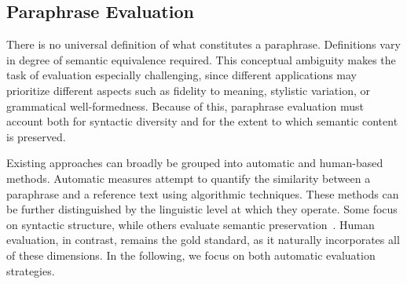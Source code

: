 
\subsection{Paraphrase Evaluation}
\label{subsec:paraphrase_evaluation}

There is no universal definition of what constitutes a paraphrase. 
Definitions vary in degree of semantic equivalence required. 
This conceptual ambiguity makes the task of evaluation especially challenging, since different applications may prioritize different aspects such as fidelity to meaning, stylistic variation, or grammatical well-formedness.
Because of this, paraphrase evaluation must account both for syntactic diversity and for the extent to which semantic content is preserved. 

Existing approaches can broadly be grouped into automatic and human-based methods. 
Automatic measures attempt to quantify the similarity between a paraphrase and a reference text using algorithmic techniques. 
These methods can be further distinguished by the linguistic level at which they operate. 
Some focus on syntactic structure, while others evaluate semantic preservation~\citep{gohsen_captions_2023}. 
Human evaluation, in contrast, remains the gold standard, as it naturally incorporates all of these dimensions.
In the following, we focus on both automatic evaluation strategies. 





